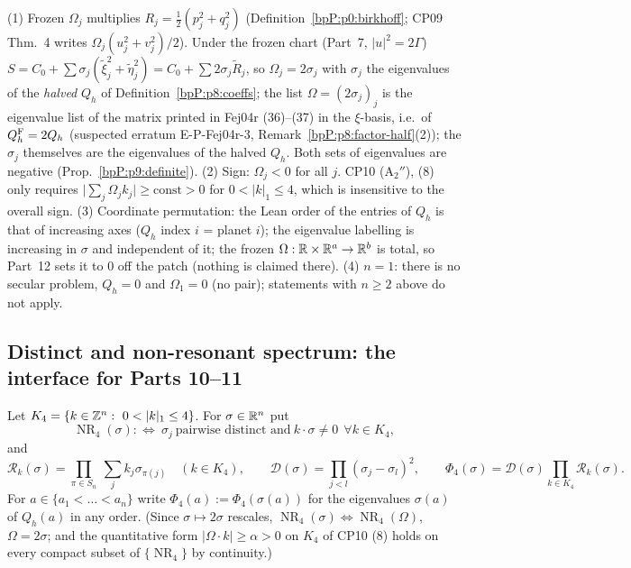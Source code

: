 \begin{remark}\label{bpP:p9:dict}
(1) Frozen $\Omega_j$ multiplies $R_j=\tfrac12(p_j^2+q_j^2)$ (Definition~\ref{bpP:p0:birkhoff}; CP09 Thm.~4 writes $\Omega_j(u_j^2+v_j^2)/2$). Under the frozen chart (Part~7, $\lvert u\rvert^2=2\Gamma$) $S=C_0+\sum\sigma_j(\tilde\xi_j^2+\tilde\eta_j^2)=C_0+\sum2\sigma_j\tilde R_j$, so $\Omega_j=2\sigma_j$ with $\sigma_j$ the eigenvalues of the \emph{halved} $Q_h$ of Definition~\ref{bpP:p8:coeffs}; the list $\Omega=(2\sigma_j)_j$ is the eigenvalue list of the matrix printed in Fej04r (36)--(37) in the $\xi$-basis, i.e.\ of $Q_h^{\rm F}=2Q_h$ (suspected erratum E-P-Fej04r-3, Remark~\ref{bpP:p8:factor-half}(2)); the $\sigma_j$ themselves are the eigenvalues of the halved $Q_h$. Both sets of eigenvalues are negative (Prop.~\ref{bpP:p9:definite}).
(2) Sign: $\Omega_j<0$ for all $j$. CP10 (A$_2''$), (8) only requires $\lvert\sum_j\Omega_jk_j\rvert\ge\mathrm{const}>0$ for $0<\lvert k\rvert_1\le4$, which is insensitive to the overall sign.
(3) Coordinate permutation: the Lean order of the entries of $Q_h$ is that of increasing axes ($Q_h$ index $i$ = planet $i$); the eigenvalue labelling is increasing in $\sigma$ and independent of it; the frozen $\Omega:\mathbb{R}\times\mathbb{R}^a\to\mathbb{R}^b$ is total, so Part~12 sets it to $0$ off the patch (nothing is claimed there).
(4) $n=1$: there is no secular problem, $Q_h=0$ and $\Omega_1=0$ (no pair); statements with $n\ge2$ above do not apply.
\end{remark}

\subsection{Distinct and non-resonant spectrum: the interface for Parts 10--11}\label{bpP:p9:sec-int}

\begin{definition}\label{bpP:p9:good}
Let $K_4=\{k\in\mathbb{Z}^n:\ 0<\lvert k\rvert_1\le4\}$. For $\sigma\in\mathbb{R}^n$ put
\[\operatorname{NR}_4(\sigma):\Longleftrightarrow\ \sigma_j\ \text{pairwise distinct and}\ k\cdot\sigma\ne0\ \ \forall k\in K_4,\]
and
\[\mathcal R_k(\sigma)=\prod_{\pi\in S_n}\ \sum_jk_j\sigma_{\pi(j)}\quad(k\in K_4),\qquad \mathcal D(\sigma)=\prod_{j<l}(\sigma_j-\sigma_l)^2,\qquad \Phi_4(\sigma)=\mathcal D(\sigma)\prod_{k\in K_4}\mathcal R_k(\sigma).\]
For $a\in\{a_1<\dots<a_n\}$ write $\Phi_4(a):=\Phi_4(\sigma(a))$ for the eigenvalues $\sigma(a)$ of $Q_h(a)$ in any order. (Since $\sigma\mapsto 2\sigma$ rescales, $\operatorname{NR}_4(\sigma)\Leftrightarrow\operatorname{NR}_4(\Omega)$, $\Omega=2\sigma$; and the quantitative form $\lvert\Omega\cdot k\rvert\ge\alpha>0$ on $K_4$ of CP10 (8) holds on every compact subset of $\{\operatorname{NR}_4\}$ by continuity.)
\end{definition}

